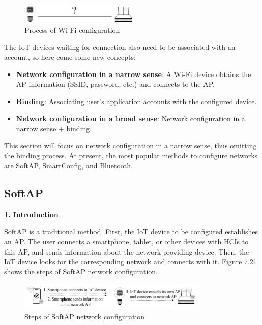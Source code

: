\documentclass[a4paper,12pt,openany]{book}
\begin{document}
\begin{figure}[!h]
    \centering
    \includegraphics[width=0.5\textwidth]{D7Z/7-20}
    \caption{Process of Wi-Fi configuration}
\end{figure}

The IoT devices waiting for connection also need to be associated with an account, so here come some new concepts:

\begin{itemize}[noitemsep]
    \item \textbf{Network configuration in a narrow sense}: A Wi-Fi device obtains the AP information (SSID, password, etc.) and connects to the AP.
    \item \textbf{Binding}: Associating user's application accounts with the configured device.
    \item \textbf{Network configuration in a broad sense}: Network configuration in a narrow sense + binding.
\end{itemize}

This section will focus on network configuration in a narrow sense, thus omitting the binding process. At present, the most popular methods to configure networks are SoftAP, SmartConfig, and Bluetooth.

\subsection{SoftAP}
\textbf{1. Introduction}

SoftAP is a traditional method. First, the IoT device to be configured establishes an AP. The user connects a smartphone, tablet, or other devices with HCIs to this AP, and sends information about the network providing device. Then, the IoT device looks for the corresponding network and connects with it. Figure 7.21 shows the steps of SoftAP network configuration.

\begin{figure}[!h]
    \centering
    \includegraphics[width=0.8\textwidth]{D7Z/7-21}
    \caption{Steps of SoftAP network configuration}
\end{figure}
\end{document}
